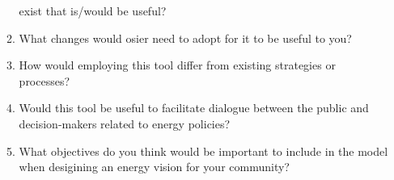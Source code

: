 \begin{enumerate}
\begin{enumerate}
        exist that is/would be useful?
        \item What changes would \ac{osier} need to adopt for it to be useful to
        you?
        \item How would employing this tool differ from existing strategies or
        processes?
        \item Would this tool be useful to facilitate dialogue between the
        public and decision-makers related to energy policies?
        \item What objectives do you think would be important to include in the
        model when desigining an energy vision for your community?
    \end{enumerate}
\end{enumerate}